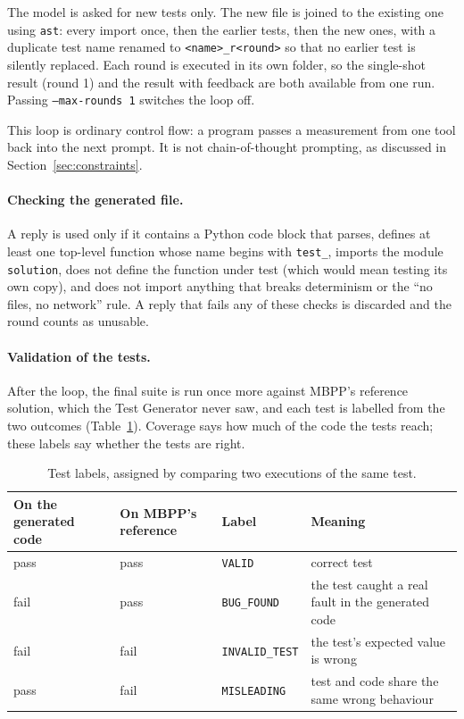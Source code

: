 \documentclass[11pt,a4paper]{article}
\begin{document}
The model is asked for new tests only. The new file is joined to the existing one using \texttt{ast}: every
import once, then the earlier tests, then the new ones, with a duplicate test name renamed to
\texttt{<name>\_r<round>} so that no earlier test is silently replaced. Each round is executed in its own
folder, so the single-shot result (round 1) and the result with feedback are both available from one run.
Passing \texttt{--max-rounds 1} switches the loop off.

This loop is ordinary control flow: a program passes a measurement from one tool back into the next prompt. It
is not chain-of-thought prompting, as discussed in Section~\ref{sec:constraints}.

\paragraph{Checking the generated file.} A reply is used only if it contains a Python code block that parses,
defines at least one top-level function whose name begins with \texttt{test\_}, imports the module
\texttt{solution}, does not define the function under test (which would mean testing its own copy), and does
not import anything that breaks determinism or the ``no files, no network'' rule. A reply that fails any of
these checks is discarded and the round counts as unusable.

\paragraph{Validation of the tests.} After the loop, the final suite is run once more against MBPP's reference
solution, which the Test Generator never saw, and each test is labelled from the two outcomes
(Table~\ref{tab:labels}). Coverage says how much of the code the tests reach; these labels say whether the
tests are right.

\begin{table}[htbp]
\centering
\small
\caption{Test labels, assigned by comparing two executions of the same test.}
\label{tab:labels}
\begin{tabular}{@{}llll@{}}
\toprule
\textbf{On the generated code} & \textbf{On MBPP's reference} & \textbf{Label} & \textbf{Meaning} \\
\midrule
pass & pass & \texttt{VALID} & correct test \\
fail & pass & \texttt{BUG\_FOUND} & the test caught a real fault in the generated code \\
fail & fail & \texttt{INVALID\_TEST} & the test's expected value is wrong \\
pass & fail & \texttt{MISLEADING} & test and code share the same wrong behaviour \\
\bottomrule
\end{tabular}
\end{table}
\end{document}
